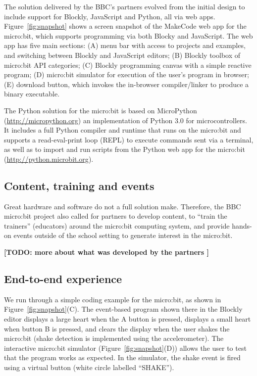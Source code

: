

The solution delivered by the BBC's partners evolved from the initial
design to include support for Blockly, JavaScript and Python, all
via web apps.
Figure~\ref{fig:snapshot} shows a screen snapshot of the MakeCode web app
for the micro:bit,
which supports programming via both Blocky and JavaScript.
The web app has five main sections: (A) menu bar with access to projects
and examples, and switching between Blockly and JavaScript editors; (B)
Blockly toolbox of micro:bit API categories; (C) Blockly programming
canvas with a simple reactive program; (D) micro:bit simulator for execution
of the user's program in browser; (E) download button, which invokes the in-browser
compiler/linker to produce a binary executable.

The Python solution for the micro:bit is based on MicroPython (\url{http://micropython.org})
an implementation of Python 3.0 for microcontrollers. It includes
a full Python compiler and runtime that runs on the micro:bit and
supports a read-eval-print loop (REPL) to execute commands sent via
a terminal, as well as to import and run scripts from the Python web app for
the micro:bit (\url{http://python.microbit.org}).


\subsection{Content, training and events}

Great hardware and software do not a full solution make. Therefore,
the BBC micro:bit project also called for partners to develop content,
to ``train the trainers'' (educators) around the micro:bit computing
system, and provide hands-on events outside of the school setting to
generate interest in the micro:bit.

{\bf [TODO: more about what was developed by the partners ]}

\subsection{End-to-end experience}

We run through a simple coding example for the micro:bit, as shown
in Figure~\ref{fig:snapshot}(C). The event-based program shown there
in the Blockly editor displays a large heart when the
A button is pressed, displays a small heart when button B is pressed,
and clears the display when the user shakes the micro:bit (shake
detection is implemented using the accelerometer). The interactive
micro:bit simulator
(Figure~\ref{fig:snapshot}(D)) allows the user to test that
the program works as expected. In the simulator, the
shake event is fired using a virtual button (white circle labelled
``SHAKE'').

